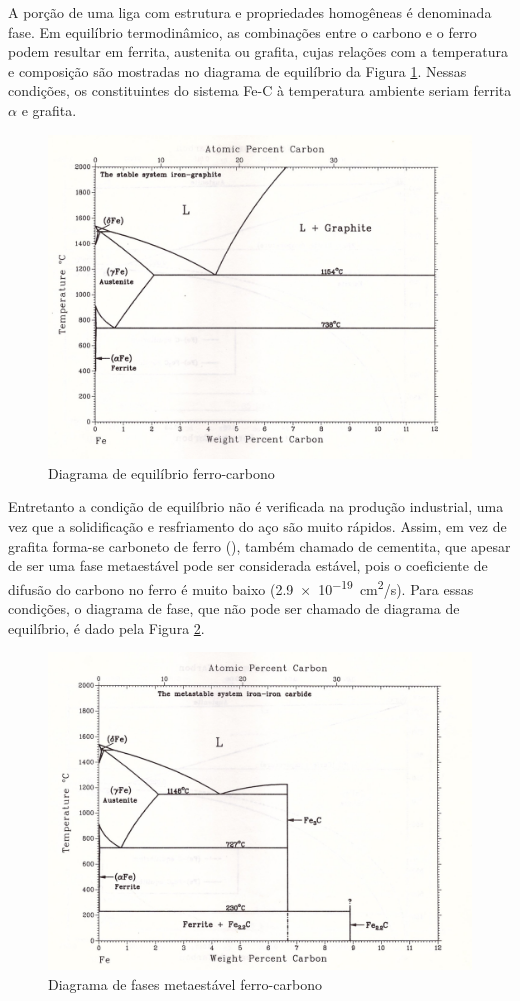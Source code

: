 \documentclass[brazil,tese,epusp]{usp}
\begin{document}
A porção de uma liga com estrutura e propriedades homogêneas é denominada fase. Em equilíbrio termodinâmico, as combinações entre o carbono e o ferro podem resultar em ferrita, austenita ou grafita, cujas relações com a temperatura e composição são mostradas no diagrama de equilíbrio da Figura \ref{fig:diagrama_fe-c}. Nessas condições, os constituintes do sistema Fe-C à temperatura ambiente seriam ferrita $\alpha$ e grafita.

\begin{figure}[ht!]
  \includegraphics[width=.8\textwidth,angle=180]{img/Fe-C.jpg}
  \caption{Diagrama de equilíbrio ferro-carbono \cite{Massalski1996v1}}
  \label{fig:diagrama_fe-c}
\end{figure}

Entretanto a condição de equilíbrio não é verificada na produção industrial, uma vez que a solidificação e resfriamento do aço são muito rápidos. Assim, em vez de grafita forma-se carboneto de ferro (), também chamado de cementita, que apesar de ser uma fase metaestável pode ser considerada estável, pois o coeficiente de difusão do carbono no ferro é muito baixo (\SI{2,9e-19}{cm^2/s}). Para essas condições, o diagrama de fase, que não pode ser chamado de diagrama de equilíbrio, é dado pela Figura \ref{fig:diagrama_fe-c_meta}.

\begin{figure}[ht!]
  \includegraphics[width=.8\textwidth,angle=180]{img/Fe-C_meta.jpg}
  \caption{Diagrama de fases metaestável ferro-carbono \cite{Massalski1996v1}}
  \label{fig:diagrama_fe-c_meta}
\end{figure}
\end{document}
